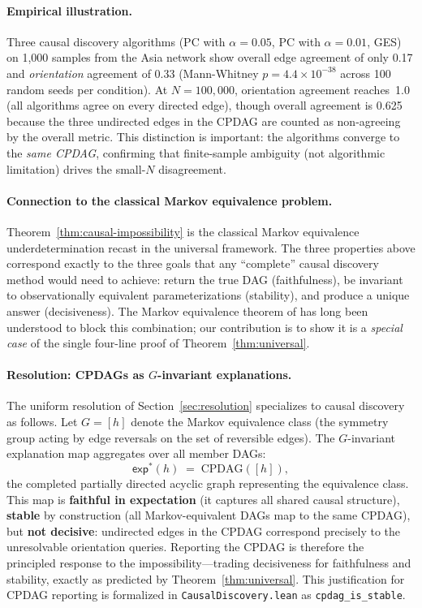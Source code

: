 \paragraph{Empirical illustration.}
Three causal discovery algorithms (PC with $\alpha = 0.05$, PC with
$\alpha = 0.01$, GES) on 1{,}000 samples from the Asia network show
overall edge agreement of only 0.17 and \emph{orientation} agreement of 0.33
(Mann-Whitney $p = 4.4 \times 10^{-38}$ across 100 random seeds per condition).
At $N = 100{,}000$, orientation agreement reaches~1.0 (all algorithms agree on
every directed edge), though overall agreement is 0.625 because the three
undirected edges in the CPDAG are counted as non-agreeing by the overall
metric.  This distinction is important: the algorithms converge to the
\emph{same CPDAG}, confirming that finite-sample ambiguity (not algorithmic
limitation) drives the small-$N$ disagreement.

\paragraph{Connection to the classical Markov equivalence problem.}
Theorem~\ref{thm:causal-impossibility} is the classical Markov equivalence underdetermination
recast in the universal framework.  The three properties above correspond
exactly to the three goals that any ``complete'' causal discovery method would
need to achieve: return the true DAG (faithfulness), be invariant to
observationally equivalent parameterizations (stability), and produce a unique
answer (decisiveness).  The Markov equivalence theorem of
\citet{verma1991equivalence} has long been understood to block this
combination; our contribution is to show it is a \emph{special case} of the
single four-line proof of Theorem~\ref{thm:universal}.

\paragraph{Resolution: CPDAGs as $G$-invariant explanations.}
The uniform resolution of Section~\ref{sec:resolution} specializes to causal
discovery as follows.  Let $G = [h]$ denote the Markov equivalence class
(the symmetry group acting by edge reversals on the set of reversible edges).
The $G$-invariant explanation map aggregates over all member DAGs:
\[
  \mathsf{exp}^*(h)
  \;=\;
  \mathrm{CPDAG}([h]),
\]
the completed partially directed acyclic graph representing the equivalence
class.  This map is \textbf{faithful in expectation} (it captures all shared
causal structure), \textbf{stable} by construction (all Markov-equivalent
DAGs map to the same CPDAG), but \textbf{not decisive}: undirected edges in
the CPDAG correspond precisely to the unresolvable orientation queries.
Reporting the CPDAG is therefore the principled response to the
impossibility---trading decisiveness for faithfulness and stability, exactly
as predicted by Theorem~\ref{thm:universal}.  This justification for CPDAG
reporting is formalized in \texttt{CausalDiscovery.lean} as
\texttt{cpdag\_is\_stable}.
